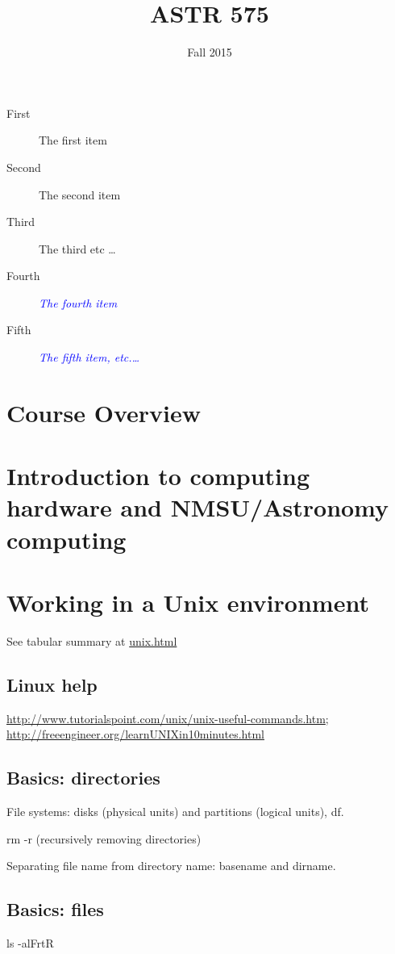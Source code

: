 \documentclass[12pt]{article}
\title{ASTR 575}
\date{Fall 2015}
\newcommand{\myitem}[2]{\item[#1] \textcolor{blue}{\emph{#2}}}
\begin{document}
\maketitle
\tableofcontents


\lipsum[1]
\begin{description}
    \item[First] The first item
    \item[Second] The second item
    \item[Third] The third etc \ldots
    \myitem{Fourth}{The fourth item}
    \myitem{Fifth}{The fifth item, etc.\ldots} 
\end{description}

\lipsum[3]


\section{Course Overview}
\section{Introduction to computing hardware and NMSU/Astronomy computing}

\section{Working in a Unix environment}
See tabular summary at \url{unix.html}
\subsection{Linux help}
\url{http://www.tutorialspoint.com/unix/unix-useful-commands.htm};
\url{http://freeengineer.org/learnUNIXin10minutes.html}
\subsection{Basics: directories}
File systems: disks (physical units) and partitions (logical units), df.

rm -r (recursively removing directories)

Separating file name from directory name: basename and dirname.

\subsection{Basics: files}
ls -alFrtR
\end{document}
